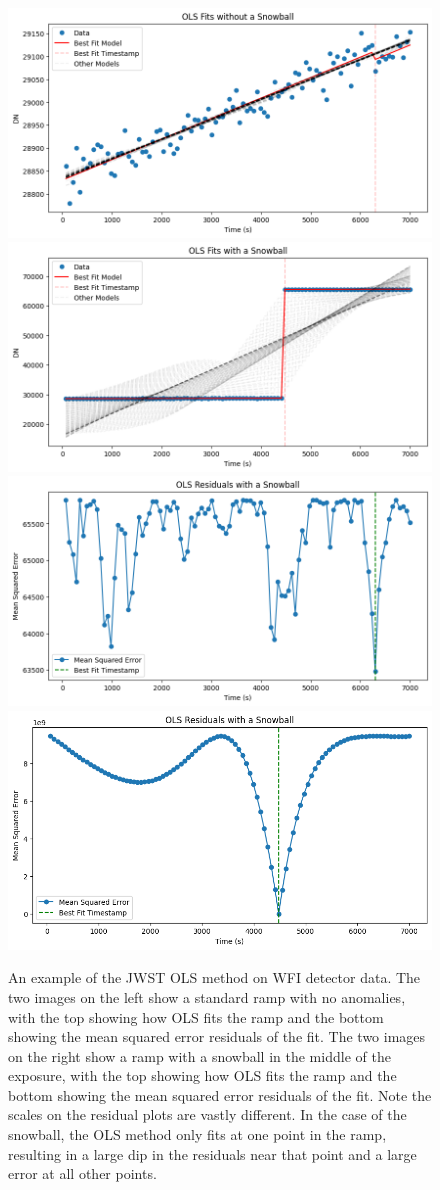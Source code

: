 \begin{figure}
    \centering
    \includegraphics[width=.49\linewidth]{figs/rst/ols_good.png}
    \includegraphics[width=.49\linewidth]{figs/rst/ols_bad.png}
    \includegraphics[width=.49\linewidth]{figs/rst/ols_good_res.png}
    \includegraphics[width=.49\linewidth]{figs/rst/ols_bad_res.png}
    \caption[Example of the JWST OLS Method on WFI Detector Data]{
        An example of the JWST OLS method on WFI detector data.
        The two images on the left show a standard ramp with no anomalies, with the top showing how OLS fits the ramp and the bottom showing the mean squared error residuals of the fit.
        The two images on the right show a ramp with a snowball in the middle of the exposure, with the top showing how OLS fits the ramp and the bottom showing the mean squared error residuals of the fit.
        Note the scales on the residual plots are vastly different.
        In the case of the snowball, the OLS method only fits at one point in the ramp, resulting in a large dip in the residuals near that point and a large error at all other points.
    }
    \label{rst/fig:jwst_ols}
\end{figure}

